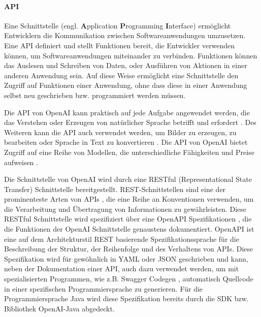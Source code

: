\paragraph{API}
\label{sec2:sota:par:api}
Eine Schnittstelle (engl. \textbf{A}pplication \textbf{P}rogramming \textbf{I}nterface) ermöglicht Entwicklern die Kommunikation zwischen Softwareanwendungen umzusetzen.
Eine API definiert und stellt Funktionen bereit, die Entwickler verwenden können, um Softwareanwendungen miteinander zu verbinden.
Funktionen können das Auslesen und Schreiben von Daten, oder Ausführen von Aktionen in einer anderen Anwendung sein.
Auf diese Weise ermöglicht eine Schnittstelle den Zugriff auf Funktionen einer Anwendung, ohne dass diese in einer Anwendung selbst neu geschrieben bzw. programmiert werden müssen.

Die API von OpenAI kann praktisch auf jede Aufgabe angewendet werden, die das Verstehen oder Erzeugen von natürlicher Sprache betrifft und erfordert \cite{openai-docs-intro}.
Des Weiteren kann die API auch verwendet werden, um Bilder zu erzeugen, zu bearbeiten oder Sprache in Text zu konvertieren \cite{openai-docs-intro}.
Die API von OpenAI bietet Zugriff auf eine Reihe von Modellen, die unterschiedliche Fähigkeiten und Preise aufweisen \cite{openai-docs-intro}.

Die Schnittstelle von OpenAI wird durch eine RESTful (Representational State Transfer) Schnittstelle bereitgestellt.
REST-Schnittstellen sind eine der prominenteste Arten von APIs \cite{postman-state-of-api-2023}, die eine Reihe an Konventionen verwenden, um die Verarbeitung und Übertragung von Informationen zu gewährleisten.
Diese RESTful Schnittstelle wird spezifiziert über eine OpenAPI Spezifikationen \cite{openai-openapi-spec}, die die Funktionen der OpenAI Schnittstelle genaustens dokumentiert.
OpenAPI ist eine auf dem Architekturstil REST basierende Spezifikationssprache für die Beschreibung der Struktur, der Reihenfolge und des Verhaltens von APIs.
Diese Spezifikation wird für gewöhnlich in YAML oder JSON geschrieben und kann, neben der Dokumentation einer API, auch dazu verwendet werden, um mit spezialisierten Programmen, wie z.B. Swagger Codegen \cite{swagger}, automatisch Quellcode in einer spezifischen Programmiersprache zu generieren.
Für die Programmiersprache Java wird diese Spezifikation bereits durch die SDK bzw. Bibliothek OpenAI-Java \cite{dall-e-java-api} abgedeckt.


